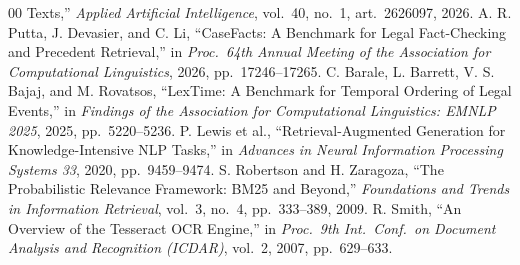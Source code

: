 \documentclass[conference]{IEEEtran}
\begin{document}
\begin{thebibliography}{00}
Texts,'' \emph{Applied Artificial Intelligence}, vol.\ 40, no.\ 1, art.\
2626097, 2026.
A. R. Putta, J. Devasier, and C. Li, ``CaseFacts: A Benchmark for Legal
Fact-Checking and Precedent Retrieval,'' in \emph{Proc.\ 64th Annual Meeting of
the Association for Computational Linguistics}, 2026, pp.\ 17246--17265.
\bibitem{lextime2025}
C. Barale, L. Barrett, V. S. Bajaj, and M. Rovatsos, ``LexTime: A Benchmark for
Temporal Ordering of Legal Events,'' in \emph{Findings of the Association for
Computational Linguistics: EMNLP 2025}, 2025, pp.\ 5220--5236.
P. Lewis et al., ``Retrieval-Augmented Generation for Knowledge-Intensive NLP
Tasks,'' in \emph{Advances in Neural Information Processing Systems 33}, 2020,
pp.\ 9459--9474.
S. Robertson and H. Zaragoza, ``The Probabilistic Relevance Framework: BM25 and
Beyond,'' \emph{Foundations and Trends in Information Retrieval}, vol.\ 3, no.\
4, pp.\ 333--389, 2009.
\bibitem{smith2007}
R. Smith, ``An Overview of the Tesseract OCR Engine,'' in \emph{Proc.\ 9th Int.\
Conf.\ on Document Analysis and Recognition (ICDAR)}, vol.\ 2, 2007, pp.\
629--633.
\end{thebibliography}
\end{document}
